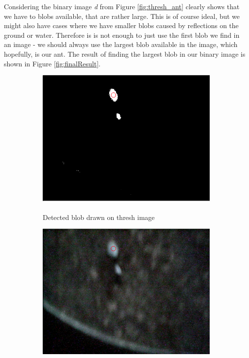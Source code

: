Considering the binary image \emph{d} from Figure \ref{fig:thresh_ant} clearly shows that we have to blobs available, that are rather large. This is of course ideal, but we might also have cases where we have smaller blobs caused by reflections on the ground or water. Therefore is is not enough to just use the first blob we find in an image - we should always use the largest blob available in the image, which hopefully, is our ant. The result of finding the largest blob in our binary image is shown in Figure \ref{fig:finalResult}.

\begin{figure}
    \captionsetup{justification=centering}
        \centering
        \begin{subfigure}[b]{0.45\textwidth}
                \includegraphics[scale = 0.25]{img/threshblob}
                \caption{\mbox{}\\Detected blob drawn on thresh image}
        \end{subfigure}
		\quad
        \centering
        \begin{subfigure}[b]{0.45\textwidth}
                \includegraphics[scale = 0.25]{img/srcblob}

\end{subfigure}
\end{figure}
